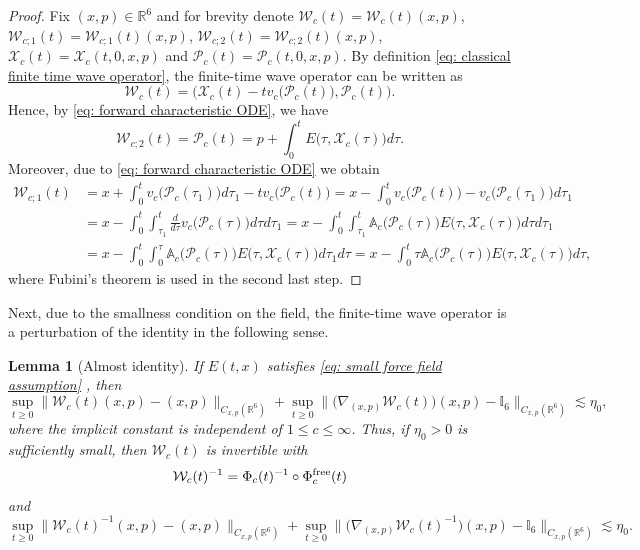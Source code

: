 \documentclass[reqno, 11pt, letterpaper]{amsart}
\newtheorem{lemma}[theorem]{Lemma}
\theoremstyle{remark}
\numberwithin{equation}{section}
\numberwithin{theorem}{section}
\numberwithin{table}{section}
\numberwithin{figure}{section}
\begin{document}
\begin{proof}
Fix $(x,p)\in\mathbb{R}^6$ and for brevity denote $\mathcal{W}_{c}(t)=\mathcal{W}_{c}(t)(x,p)$, $\mathcal{W}_{c;1}(t)=\mathcal{W}_{c;1}(t)(x,p)$, $\mathcal{W}_{c;2}(t)=\mathcal{W}_{c;2}(t)(x,p)$, $\mathcal{X}_c(t)=\mathcal{X}_c(t,0,x,p)$ and $\mathcal{P}_c(t)=\mathcal{P}_c(t,0,x,p)$. By definition \eqref{eq: classical finite time wave operator}, the finite-time wave operator can be written as 
$$\mathcal{W}_c(t)=\Big(\mathcal{X}_c(t)-tv_c\big(\mathcal{P}_c(t)\big),\mathcal{P}_c(t)\Big).$$
Hence, by \eqref{eq: forward characteristic ODE}, we have
$$\mathcal{W}_{c;2}(t)=\mathcal{P}_c(t)=p+\int_0^t E\big(\tau,\mathcal{X}_c(\tau)\big)d\tau.$$
Moreover, due to \eqref{eq: forward characteristic ODE} we obtain 
$$\begin{aligned}
\mathcal{W}_{c;1}(t)&=x+\int_0^t v_c\big(\mathcal{P}_c(\tau_1)\big)d\tau_1-tv_c\big(\mathcal{P}_c(t)\big)=x-\int_0^t v_c\big(\mathcal{P}_c(t)\big)-v_c\big(\mathcal{P}_c(\tau_1)\big)d\tau_1\\
&=x-\int_0^t \int_{\tau_1}^t \frac{d}{d\tau}v_c\big(\mathcal{P}_c(\tau)\big)d\tau d\tau_1=x-\int_0^t \int_{\tau_1}^t \mathbb{A}_c\big(\mathcal{P}_c(\tau)\big)E\big(\tau,\mathcal{X}_c(\tau)\big) d\tau d\tau_1\\
&=x-\int_0^t \int_0^{\tau} \mathbb{A}_c\big(\mathcal{P}_c(\tau)\big)E\big(\tau,\mathcal{X}_c(\tau)\big) d\tau_1 d\tau=x-\int_0^t \tau\mathbb{A}_c\big(\mathcal{P}_c(\tau)\big)E\big(\tau,\mathcal{X}_c(\tau)\big) d\tau,
\end{aligned}$$
where Fubini's theorem is used in the second last step.
\end{proof}

Next, due to the smallness condition on the field, the finite-time wave operator is a perturbation of the identity in the following sense.

\begin{lemma}[Almost identity]
\label{lemma:  the wave operator, almost identity}
If $E(t,x)$ satisfies \eqref{eq: small force field assumption} , then
\begin{equation}\label{eq: approx identity, finite-time wave operator}
\sup_{t\geq 0}\Big\|\mathcal{W}_c(t)(x,p)-(x,p)\Big\|_{C_{x,p}(\mathbb{R}^6)}+\sup_{t\geq 0}\Big\|\Big(\nabla_{(x,p)}\mathcal{W}_c(t)\Big)(x,p)-\mathbb{I}_6\Big\|_{C_{x,p}(\mathbb{R}^6)}\lesssim\eta_0,
\end{equation}
where the implicit constant is independent of $1 \leq c \leq \infty$. Thus, if $\eta_0>0$ is sufficiently small, then $\mathcal{W}_c(t)$ is invertible with 
$$\mathcal{W}_c(t)^{-1} = \Phi_c(t)^{-1} \circ \Phi_c^{\textup{free}}(t)$$
and
\begin{equation}\label{eq: approx identity, inverse finite-time wave operator}
\sup_{t\geq 0}\Big\|\mathcal{W}_c(t)^{-1}(x,p)-(x,p)\Big\|_{C_{x,p}(\mathbb{R}^6)}+\sup_{t\geq 0}\Big\|\Big(\nabla_{(x,p)}\mathcal{W}_c(t)^{-1}\Big)(x,p)-\mathbb{I}_6\Big\|_{C_{x,p}(\mathbb{R}^6)}\lesssim\eta_0.
\end{equation}
\end{lemma} 
\end{document}
